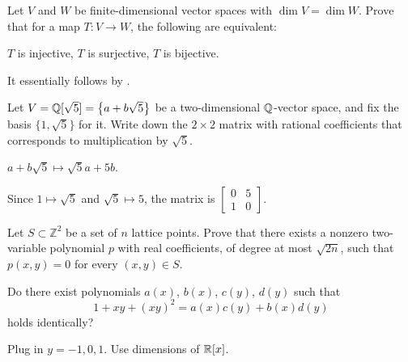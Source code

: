 \begin{dproblem}
	\label{prob:equal_dimension}
	Let $V$ and $W$ be finite-dimensional vector
	spaces with $\dim V = \dim W$.
	Prove that for a map $T \colon V \to W$,
	the following are equivalent:
	\begin{itemize}
		\ii $T$ is injective,
		\ii $T$ is surjective,
		\ii $T$ is bijective.
	\end{itemize}
	\begin{sol}
		It essentially follows by .
	\end{sol}
\end{dproblem}

\begin{problem}
	Let $V = \mathbb Q[\sqrt5] = \left\{ a + b \sqrt 5 \right\}$
	be a two-dimensional $\mathbb Q$-vector space,
	and fix the basis $\{1, \sqrt 5\}$ for it.
	Write down the $2 \times 2$ matrix with rational coefficients
	that corresponds to multiplication by $\sqrt 5$.
	\begin{hint}
		$a + b \sqrt 5 \mapsto \sqrt 5 a + 5b$.
	\end{hint}
	\begin{sol}
		Since $1 \mapsto \sqrt5$ and $\sqrt5 \mapsto 5$,
		the matrix is
		$\begin{bmatrix}
			0 & 5 \\
			1 & 0
		\end{bmatrix}$.
	\end{sol}
\end{problem}

\begin{problem}
	Let $S \subset {\mathbb Z}^2$ be a set of $n$ lattice points.
	Prove that there exists a nonzero two-variable polynomial $p$
	with real coefficients, of degree at most $\sqrt{2n}$,
	such that $p(x,y) = 0$ for every $(x,y) \in S$.
\end{problem}

\begin{problem}
	[Putnam 2003]
	Do there exist polynomials $a(x)$, $b(x)$, $c(y)$, $d(y)$ such that
	\[ 1 + xy + (xy)^2 = a(x)c(y) + b(x)d(y) \]
	holds identically?
	\begin{hint}
		Plug in $y = -1, 0, 1$. Use dimensions of $\mathbb R[x]$.
	\end{hint}
\end{problem}

